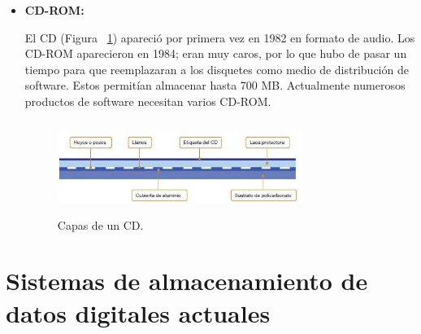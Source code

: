 \documentclass[10pt,journal]{IEEEtran}
\begin{document}
\begin{itemize}
    \item \textbf{CD-ROM:} \par
    El CD (Figura ~\ref{f3}) apareció por primera vez en 1982 en formato de audio. Los CD-ROM aparecieron en 1984; eran muy caros, por lo que hubo de pasar un tiempo para que reemplazaran a los disquetes como medio de distribución de software. Estos permitían almacenar hasta 700 MB. Actualmente numerosos productos de software necesitan varios CD-ROM.
\begin{figure}[H]
 \begin{center}
       \includegraphics[width=8cm, height=3cm]{figuras/3.JPG}
      \caption{Capas de un CD.}
      \label{f3} 
      \end{center}
\end{figure}
\end{itemize}
\section{\textbf{Sistemas de almacenamiento de datos digitales actuales}}
\end{document}
